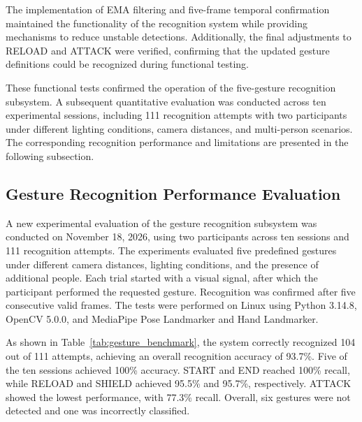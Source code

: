 \documentclass[lettersize,journal]{IEEEtran}
\begin{document}
	The implementation of EMA filtering and five-frame temporal confirmation maintained the functionality of the recognition system while providing mechanisms to reduce unstable detections. Additionally, the final adjustments to RELOAD and ATTACK were verified, confirming that the updated gesture definitions could be recognized during functional testing.
	
	These functional tests
	confirmed the operation of the five-gesture recognition
	subsystem. A subsequent quantitative evaluation was
	conducted across ten experimental sessions, including
	111 recognition attempts with two participants under
	different lighting conditions, camera distances, and
	multi-person scenarios. The corresponding recognition
	performance and limitations are presented in the
	following subsection.

	\subsection{Gesture Recognition Performance Evaluation}
	
	A new experimental evaluation
	of the gesture recognition subsystem was conducted on
	November 18, 2026, using two participants across ten
	sessions and 111 recognition attempts. The experiments
	evaluated five predefined gestures under different
	camera distances, lighting conditions, and the presence
	of additional people. Each trial started with a visual
	signal, after which the participant performed the
	requested gesture. Recognition was confirmed after five
	consecutive valid frames. The tests were performed on
	Linux using Python 3.14.8, OpenCV 5.0.0, and MediaPipe
	Pose Landmarker and Hand Landmarker.

	
	As shown in
	Table~\ref{tab:gesture_benchmark}, the system correctly
	recognized 104 out of 111 attempts, achieving an overall
	recognition accuracy of 93.7\%. Five of the ten sessions
	achieved 100\% accuracy. START and END reached 100\%
	recall, while RELOAD and SHIELD achieved 95.5\% and
	95.7\%, respectively. ATTACK showed the lowest
	performance, with 77.3\% recall. Overall, six gestures
	were not detected and one was incorrectly classified.
\end{document}
